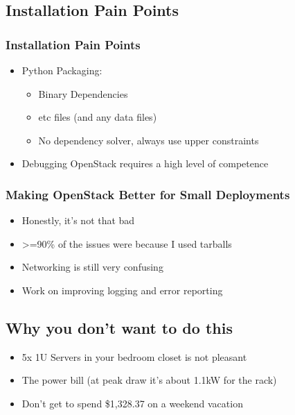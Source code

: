 \documentclass[aspectratio=169,11pt,hyperref={colorlinks=true}]{beamer}
\begin{document}
\subsection{Installation Pain Points}
\begin{frame}
    \frametitle{Installation Pain Points}
    \begin{itemize}
        \item Python Packaging:
            \begin{itemize}
                \item Binary Dependencies
                \item etc files (and any data files)
                \item No dependency solver, always use upper constraints
            \end{itemize}
        \item Debugging OpenStack requires a high level of competence
    \end{itemize}
\end{frame}
\begin{frame}
    \frametitle{Making OpenStack Better for Small Deployments}
    \begin{itemize}
        \item Honestly, it's not that bad
        \item >=90\% of the issues were because I used tarballs
        \item Networking is still very confusing
        \item Work on improving logging and error reporting
    \end{itemize}
\end{frame}

\subsection{Why you don't want to do this}
\begin{frame}
    \begin{itemize}
        \item 5x 1U Servers in your bedroom closet is not pleasant
        \item The power bill (at peak draw it's about 1.1kW for the rack)
        \item Don't get to spend \$1,328.37 on a weekend vacation
    \end{itemize}
\end{frame}
\end{document}
